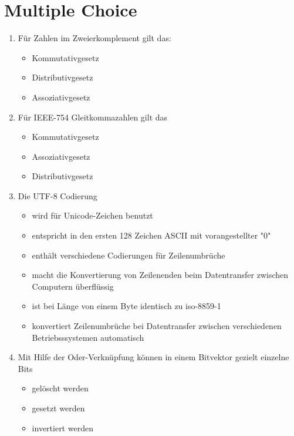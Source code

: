 \documentclass{exercisesheet}
\begin{document}
  \section*{Multiple Choice}\label{sec:mc} %
    \begin{enumerate}
      \item Für Zahlen im Zweierkomplement gilt das:
        \begin{itemize}
          \item Kommutativgesetz \checkmark
          \item Distributivgesetz \checkmark
          \item Assoziativgesetz \checkmark
        \end{itemize}
      \item Für IEEE-754 Gleitkommazahlen gilt das
        \begin{itemize}
          \item Kommutativgesetz \checkmark
          \item Assoziativgesetz
          \item Distributivgesetz
        \end{itemize}
      \item Die UTF-8 Codierung
        \begin{itemize}
          \item wird für Unicode-Zeichen benutzt \checkmark
          \item entspricht in den ersten 128 Zeichen ASCII mit vorangestellter "0" \checkmark
          \item enthält verschiedene Codierungen für Zeilenumbrüche \checkmark
          \item macht die Konvertierung von Zeilenenden beim Datentransfer zwischen Computern überflüssig
          \item ist bei Länge von einem Byte identisch zu iso-8859-1 \checkmark
          \item konvertiert Zeilenumbrüche bei Datentransfer zwischen verschiedenen Betriebsssystemen automatisch
        \end{itemize}
      \item Mit Hilfe der Oder-Verknüpfung können in einem Bitvektor gezielt einzelne Bits
        \begin{itemize}
          \item gelöscht werden
          \item gesetzt werden \checkmark
          \item invertiert werden

\end{itemize}
\end{enumerate}
\end{document}

